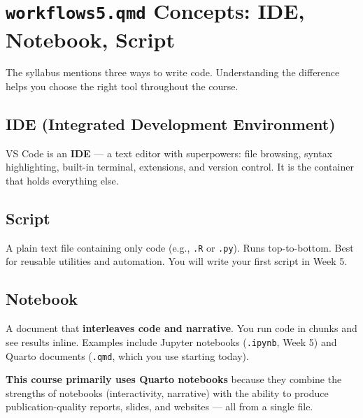 \documentclass[
  letterpaper,
  DIV=11,
  numbers=noendperiod,
  oneside]{scrreprt}
\begin{document}
\section*{\texorpdfstring{\texttt{workflows5.qmd} Concepts: IDE,
Notebook,
Script}{workflows5.qmd Concepts: IDE, Notebook, Script}}\label{workflows5.qmd-concepts-ide-notebook-script}


The syllabus mentions three ways to write code. Understanding the
difference helps you choose the right tool throughout the course.

\subsection*{IDE (Integrated Development
Environment)}\label{ide-integrated-development-environment}

VS Code is an \textbf{IDE} --- a text editor with superpowers: file
browsing, syntax highlighting, built-in terminal, extensions, and
version control. It is the container that holds everything else.

\subsection*{Script}\label{script}

A plain text file containing only code (e.g., \texttt{.R} or
\texttt{.py}). Runs top-to-bottom. Best for reusable utilities and
automation. You will write your first script in Week 5.

\subsection*{Notebook}\label{notebook}

A document that \textbf{interleaves code and narrative}. You run code in
chunks and see results inline. Examples include Jupyter notebooks
(\texttt{.ipynb}, Week 5) and Quarto documents (\texttt{.qmd}, which you
use starting today).

\textbf{This course primarily uses Quarto notebooks} because they
combine the strengths of notebooks (interactivity, narrative) with the
ability to produce publication-quality reports, slides, and websites ---
all from a single file.
\end{document}
